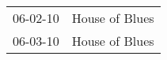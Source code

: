 \begin{supertabular}{p{0.25\columnwidth}p{0.75\columnwidth}}
 06-02-10 &  House of Blues \\
 06-03-10 &  House of Blues \\
\end{supertabular}
